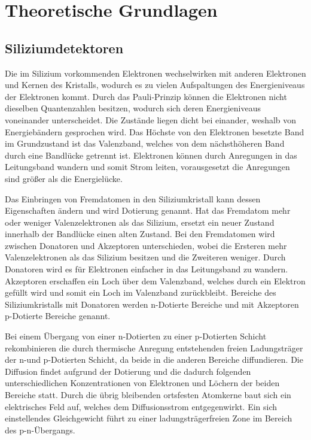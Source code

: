 \chapter{Theoretische Grundlagen}


\section{Siliziumdetektoren}

Die im Silizium vorkommenden Elektronen wechselwirken mit anderen Elektronen und
Kernen des Kristalls, wodurch es zu vielen Aufspaltungen des Energieniveaus der Elektronen kommt. Durch das Pauli-Prinzip können
die Elektronen nicht dieselben Quantenzahlen besitzen, wodurch sich deren Energieniveaus voneinander unterscheidet.
Die Zustände liegen dicht bei einander, weshalb von Energiebändern gesprochen wird.
Das Höchste von den Elektronen besetzte Band im Grundzustand ist das Valenzband, welches von dem
nächsthöheren Band durch eine Bandlücke getrennt ist. Elektronen können
durch Anregungen in das Leitungsband wandern und somit Strom leiten, vorausgesetzt
die Anregungen sind größer als die Energielücke.

Das Einbringen von Fremdatomen in den Siliziumkristall kann dessen Eigenschaften ändern
und wird Dotierung genannt.
Hat das Fremdatom mehr oder weniger Valenzelektronen als das Silizium, ersetzt ein neuer Zustand innerhalb der Bandlücke
einen alten Zustand.
Bei den Fremdatomen wird zwischen Donatoren und Akzeptoren unterschieden, wobei die
Ersteren mehr Valenzelektronen als das Silizium besitzen und die Zweiteren weniger.
Durch Donatoren wird es für Elektronen einfacher in das Leitungsband zu wandern. Akzeptoren
erschaffen ein Loch über dem Valenzband, welches durch ein Elektron gefüllt wird und somit ein
Loch im Valenzband zurückbleibt.
Bereiche des Siliziumkristalls mit Donatoren werden n-Dotierte Bereiche
und mit Akzeptoren p-Dotierte Bereiche genannt.

Bei einem Übergang von einer n-Dotierten zu einer p-Dotierten Schicht rekombinieren die durch
thermische Anregung entstehenden freien Ladungsträger
der n-und p-Dotierten Schicht, da beide
in die anderen Bereiche diffundieren. Die Diffusion findet aufgrund der Dotierung und die dadurch folgenden unterschiedlichen
Konzentrationen von Elektronen und Löchern der beiden Bereiche statt.
Durch die übrig bleibenden ortsfesten Atomkerne
baut sich ein elektrisches Feld auf, welches dem Diffusionsstrom entgegenwirkt.
Ein sich einstellendes Gleichgewicht führt zu einer ladungsträgerfreien Zone
im Bereich des p-n-Übergangs.

